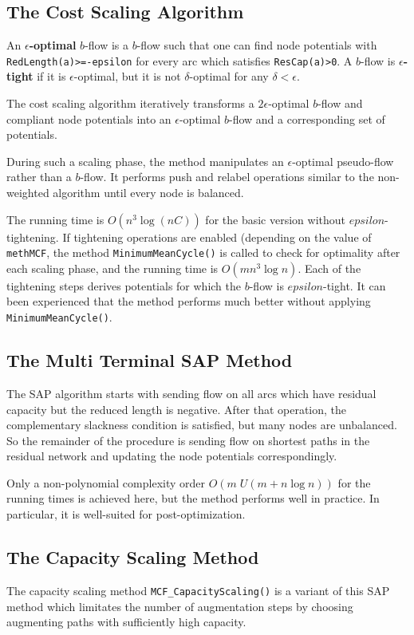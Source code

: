 \documentclass[a4paper,11pt,twoside]{book}
\begin{document}
\begin{multicols}{2}
\subsection{The Cost Scaling Algorithm}
An {\bf $\epsilon$-optimal} $b$-flow is a
$b$-flow such that one can find node potentials with
\verb/RedLength(a)>=-epsilon/ for every arc
which satisfies \verb/ResCap(a)>0/. A $b$-flow is {\bf $\epsilon$-tight}
 if it is $\epsilon$-optimal, but it is not
$\delta$-optimal for any $\delta<\epsilon$.

The cost scaling algorithm iteratively transforms a $2\epsilon$-optimal
$b$-flow and compliant node potentials into an $\epsilon$-optimal
$b$-flow and a corresponding set of potentials.

During such a scaling phase, the method manipulates an $\epsilon$-optimal
pseudo-flow rather than a $b$-flow. It performs push and relabel operations
similar to the non-weighted algorithm until every node is balanced.

The running time is $O(n^3\log(nC))$ for the basic version without
$epsilon$-tightening. If tightening operations are enabled (depending on the
value of \verb/methMCF/, the method \verb/MinimumMeanCycle()/ is called to
check for optimality after each scaling phase, and the running time is
$O(mn^3\log{n})$. Each of the tightening steps derives potentials for which
the $b$-flow is $epsilon$-tight. It can been experienced that the method
performs much better without applying \verb/MinimumMeanCycle()/.


\subsection{The Multi Terminal SAP Method}
The SAP algorithm starts with sending flow on all arcs which have residual
capacity but the reduced length is negative. After that operation, the
complementary slackness condition is satisfied, but many nodes are unbalanced.
So the remainder of the procedure is sending flow on shortest paths in the
residual network and updating the node potentials correspondingly.

Only a non-polynomial complexity order $O(m\;U(m+n\log{n}))$ for the running
times is achieved here, but the method performs well in practice. In particular,
it is well-suited for post-optimization.


\subsection{The Capacity Scaling Method}
The capacity scaling method \verb/MCF_CapacityScaling()/ is a variant of this
SAP method which limitates the number of augmentation steps by choosing
augmenting paths with sufficiently high capacity.


\end{multicols}
\end{document}

